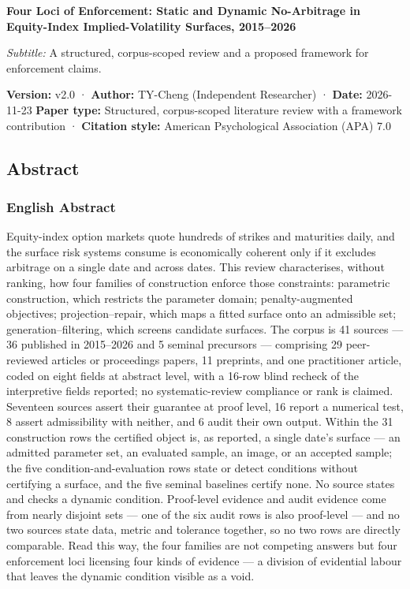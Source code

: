 \documentclass[11pt]{article}
\begin{document}
\begin{center}
{\LARGE\bfseries Four Loci of Enforcement: Static and Dynamic No-Arbitrage in Equity-Index Implied-Volatility Surfaces, 2015–2026}\\[1.2em]
\end{center}
\textit{Subtitle:} A structured, corpus-scoped review and a proposed framework for enforcement claims.

\textbf{Version:} v2.0 · \textbf{Author:} TY-Cheng (Independent Researcher) · \textbf{Date:} 2026-11-23 \textbf{Paper type:} Structured, corpus-scoped literature review with a framework contribution · \textbf{Citation style:} American Psychological Association (APA) 7.0

\subsection*{Abstract}
\subsubsection*{English Abstract}
Equity-index option markets quote hundreds of strikes and maturities daily, and the surface risk systems consume is economically coherent only if it excludes arbitrage on a single date and across dates. This review characterises, without ranking, how four families of construction enforce those constraints: parametric construction, which restricts the parameter domain; penalty-augmented objectives; projection–repair, which maps a fitted surface onto an admissible set; generation–filtering, which screens candidate surfaces. The corpus is 41 sources — 36 published in 2015–2026 and 5 seminal precursors — comprising 29 peer-reviewed articles or proceedings papers, 11 preprints, and one practitioner article, coded on eight fields at abstract level, with a 16-row blind recheck of the interpretive fields reported; no systematic-review compliance or rank is claimed. Seventeen sources assert their guarantee at proof level, 16 report a numerical test, 8 assert admissibility with neither, and 6 audit their own output. Within the 31 construction rows the certified object is, as reported, a single date's surface — an admitted parameter set, an evaluated sample, an image, or an accepted sample; the five condition-and-evaluation rows state or detect conditions without certifying a surface, and the five seminal baselines certify none. No source states and checks a dynamic condition. Proof-level evidence and audit evidence come from nearly disjoint sets — one of the six audit rows is also proof-level — and no two sources state data, metric and tolerance together, so no two rows are directly comparable. Read this way, the four families are not competing answers but four enforcement loci licensing four kinds of evidence — a division of evidential labour that leaves the dynamic condition visible as a void.
\end{document}
